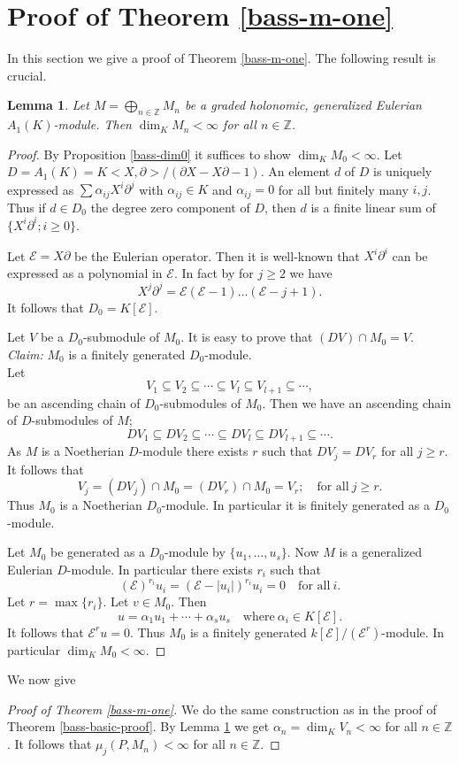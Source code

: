 \documentclass{amsart}
\newcommand{\ZZ}{\mathbb{Z} }
\newcommand{\E}{\mathcal{E} }
\theoremstyle{plain}
\newtheorem{lemma}[theorem]{Lemma}
\theoremstyle{definition}
\theoremstyle{remark}
\begin{document}
 \section{Proof of Theorem \ref{bass-m-one}}
In this section we give a proof of Theorem \ref{bass-m-one}. The following result is crucial.
\begin{lemma}\label{lemma-bass-m-one}
Let $M = \bigoplus_{n \in \ZZ } M_n$ be a graded holonomic, generalized Eulerian $A_1(K)$-module. Then $\dim_K M_n < \infty$ for all $n \in \ZZ$.
\end{lemma}
 \begin{proof}
By Proposition \ref{bass-dim0} it suffices to show $\dim_K M_0 < \infty$. Let 
$D = A_1(K) = K<X, \partial>/(\partial X - X \partial -1)$. An element $d$ of $D$ is uniquely expressed as $\sum \alpha_{ij} X^i\partial^j$ with $\alpha_{ij} \in K$ and $\alpha_{ij} = 0$ for all but finitely many $i,j$. Thus  if $d \in D_0$ the degree zero component of $D$, then $d$ is a finite  linear sum of 
$\{ X^i\partial^i ; i \geq 0 \}$. 

Let $\E = X\partial$ be the Eulerian operator. Then it is well-known that
$X^i\partial^i$ can be expressed as a polynomial in $\E$. In fact by 
\cite[Lemma 1.3.1]{SST}
for $j \geq 2$ we have
\[
X^j\partial^j = \E(\E -1)\ldots (\E - j + 1).
\]
It follows that $D_0 = K[\E]$.

Let $V$ be a $D_0$-submodule of $M_0$. It is easy to prove that $(D V) \cap M_0  = V$. \\
\textit{Claim:} $M_0$ is a finitely generated $D_0$-module.\\
Let $$V_1 \subseteq V_2 \subseteq  \cdots \subseteq V_l \subseteq V_{l+1} \subseteq  \cdots, $$
be an ascending chain of $D_0$-submodules of $M_0$.
Then we have an ascending chain of $D$-submodules of $M$;
$$DV_1 \subseteq DV_2 \subseteq  \cdots \subseteq DV_l \subseteq DV_{l+1} \subseteq  \cdots. $$
As $M$ is a Noetherian $D$-module there exists $r$ such that $DV_j = DV_r$ for all $j \geq r$. It follows that
\[
V_j = (DV_j)\cap M_0 = (DV_r)\cap M_0 = V_r; \quad \text{for all} \ j \geq r.
\]
Thus $M_0$ is a Noetherian $D_0$-module. In particular it is finitely generated as a $D_0$-module.

Let $M_0$ be generated as a $D_0$-module by $\{ u_1,\ldots, u_s \}$. Now $M$ is a
generalized  Eulerian $D$-module. In particular there exists $r_i$ such that
\[
(\E)^{r_i}u_i = (\E - |u_i|)^{r_i}u_i  = 0 \quad \text{for all} \ i.
\]
Let $r = \max \{ r_i \}$. Let $v \in M_0$. Then
\[
u = \alpha_1 u_1 + \cdots + \alpha_s u_s \quad \text{where} \ \alpha_i \in K[\E].
\]
It follows that $\E^r u = 0$. Thus $M_0$ is a finitely generated $k[\E]/(\E^r)$-module. In particular $\dim_K M_0 < \infty$.
\end{proof}
We now give
\begin{proof}[Proof of Theorem \ref{bass-m-one}]
We do the same construction as in the proof of Theorem \ref{bass-basic-proof}.
 By Lemma \ref{lemma-bass-m-one}   we get $ \alpha_n = \dim_K V_n < \infty $ for all $n \in \ZZ$. It follows that $\mu_j(P, M_n) < \infty$ for all $n \in \ZZ$.
\end{proof}
\end{document}
